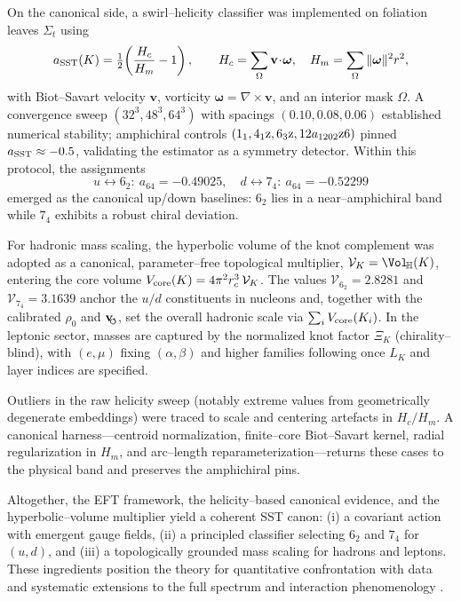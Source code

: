\documentclass[preprint,titlepage]{revtex4-2}
\newcommand{\swirlarrow}{\!\!\scriptsize\boldsymbol{\circlearrowleft}}
\newcommand{\vswirl}{\mathbf{v}_{\swirlarrow}}
\begin{document}
    On the canonical side, a swirl–helicity classifier was implemented on foliation leaves \(\Sigma_t\) using
    \[
        a_{\rm SST}(K)=\tfrac12\!\left(\frac{H_c}{H_m}-1\right),\qquad
        H_c=\sum_{\Omega}\mathbf v\!\cdot\!\boldsymbol\omega,\quad
        H_m=\sum_{\Omega}\|\boldsymbol\omega\|^2 r^2,
    \]
    with Biot–Savart velocity \(\mathbf v\), vorticity \(\boldsymbol\omega=\nabla\times\mathbf v\), and an interior mask \(\Omega\). A convergence sweep \((32^3,48^3,64^3)\) with spacings \((0.10,0.08,0.06)\) established numerical stability; amphichiral controls \((1_1,4_1{\rm z},6_3{\rm z},12a_{1202}{\rm z6})\) pinned \(a_{\rm SST}\approx-0.5\), validating the estimator as a symmetry detector. Within this protocol, the assignments
    \[
        u \leftrightarrow 6_2:\ a_{64}=-0.49025,\quad
        d \leftrightarrow 7_4:\ a_{64}=-0.52299
    \]
    emerged as the canonical up/down baselines: \(6_2\) lies in a near–amphichiral band while \(7_4\) exhibits a robust chiral deviation.

    For hadronic mass scaling, the hyperbolic volume of the knot complement was adopted as a canonical, parameter–free topological multiplier,
    \(\mathcal{V}_K=\Vol_{\!\mathbb{H}}(K)\), entering the core volume \(V_{\rm core}(K)=4\pi^2 r_c^3\,\mathcal{V}_K\).
    The values \(\mathcal{V}_{6_2}=2.8281\) and \(\mathcal{V}_{7_4}=3.1639\) anchor the \(u/d\) constituents in nucleons and, together with the calibrated \(\rho_0\) and \(\vswirl\), set the overall hadronic scale via \(\sum_i V_{\rm core}(K_i)\).
    In the leptonic sector, masses are captured by the normalized knot factor \(\Xi_K\) (chirality–blind), with \((e,\mu)\) fixing \((\alpha,\beta)\) and higher families following once \(L_K\) and layer indices are specified.

    Outliers in the raw helicity sweep (notably extreme values from geometrically degenerate embeddings) were traced to scale and centering artefacts in \(H_c/H_m\). A canonical harness—centroid normalization, finite–core Biot–Savart kernel, radial regularization in \(H_m\), and arc–length reparameterization—returns these cases to the physical band and preserves the amphichiral pins.

    Altogether, the EFT framework, the helicity–based canonical evidence, and the hyperbolic–volume multiplier yield a coherent SST canon: (i) a covariant action with emergent gauge fields, (ii) a principled classifier selecting \(6_2\) and \(7_4\) for \((u,d)\), and (iii) a topologically grounded mass scaling for hadrons and leptons. These ingredients position the theory for quantitative confrontation with data and systematic extensions to the full spectrum and interaction phenomenology \cite{Barcelo2011,Volovik2003,Faddeev1997,Arnold1998}.
\end{document}
